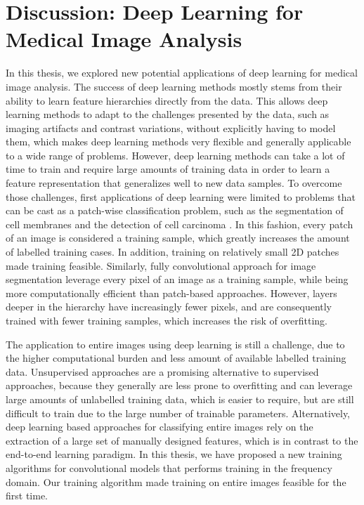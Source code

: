 \chapter{Discussion: Deep Learning for Medical Image Analysis}

In this thesis, we explored new potential applications of deep learning for
medical image analysis. The success of deep learning methods mostly stems from
their ability to learn feature hierarchies directly from the data. This allows
deep learning methods to adapt to the challenges presented by the data, such as
imaging artifacts and contrast variations, without explicitly having to model
them, which makes deep learning methods very flexible and generally applicable
to a wide range of problems. However, deep learning methods can take a lot of
time to train and require large amounts of training data in order to learn a
feature representation that generalizes well to new data samples. To overcome
those challenges, first applications of deep learning were limited to problems
that can be cast as a patch-wise classification problem, such as the
segmentation of cell membranes \citep{ciresan2012} and the detection of cell
carcinoma \citep{cancer}. In this fashion, every patch of an image is considered
a training sample, which greatly increases the amount of labelled training
cases. In addition, training on relatively small 2D patches made training
feasible. Similarly, fully convolutional approach for image segmentation
leverage every pixel of an image as a training sample, while being more
computationally efficient than patch-based approaches. However, layers deeper in
the hierarchy have increasingly fewer pixels, and are consequently trained with
fewer training samples, which increases the risk of overfitting.

The application to entire images using deep learning is still a challenge, due
to the higher computational burden and less amount of available labelled
training data. Unsupervised approaches are a promising alternative to supervised
approaches, because they generally are less prone to overfitting and can
leverage large amounts of unlabelled training data, which is easier to require,
but are still difficult to train due to the large number of trainable
parameters. Alternatively, deep learning based approaches for classifying entire
images rely on the extraction of a large set of manually designed features,
which is in contrast to the end-to-end learning paradigm. In this thesis, we
have proposed a new training algorithms for convolutional models that performs
training in the frequency domain. Our training algorithm made training on entire
images feasible for the first time.

